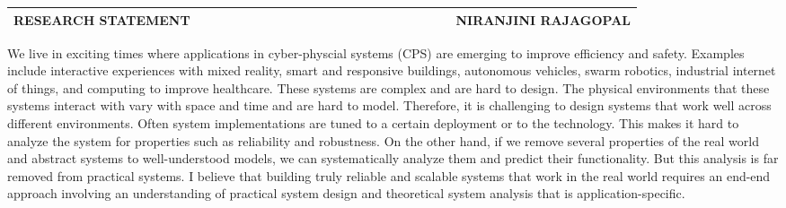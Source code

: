 \documentclass[10pt]{article}
\date{}
\begin{document}

\begin{table}
\color{magenta}
\begin{tabular*}{\textwidth}{l r}
\large\textbf{RESEARCH STATEMENT} & 
\hfill \ \ \ \ \ \ \ \ \ \ \ \ \ \ \ \ \ \ \ \
\ \ \ \ \ \ \ \ \ \ \ \ \ \ \ 
\large\textbf{NIRANJINI RAJAGOPAL}\\
\hline
\end{tabular*}

\end{table}





We live in exciting times where applications in cyber-physcial systems
(CPS) are emerging to improve efficiency and safety. Examples include
interactive experiences with mixed reality, smart and responsive
buildings, autonomous vehicles, swarm robotics, industrial internet of
things, and computing to improve healthcare. These systems are complex
and are hard to design. The physical environments that these systems
interact with vary with space and time and are hard to
model. Therefore, it is challenging to design systems that work well
across different environments. Often system implementations are tuned
to a certain deployment or to the technology. This makes it hard to
analyze the system for properties such as reliability and
robustness. On the other hand, if we remove several properties of the
real world and abstract systems to well-understood models, we can
systematically analyze them and predict their functionality. But this
analysis is far removed from practical systems. I believe that
building truly reliable and scalable systems that work in the real
world requires an end-end approach involving an understanding of
practical system design and theoretical system analysis that is
application-specific.
\end{document}
